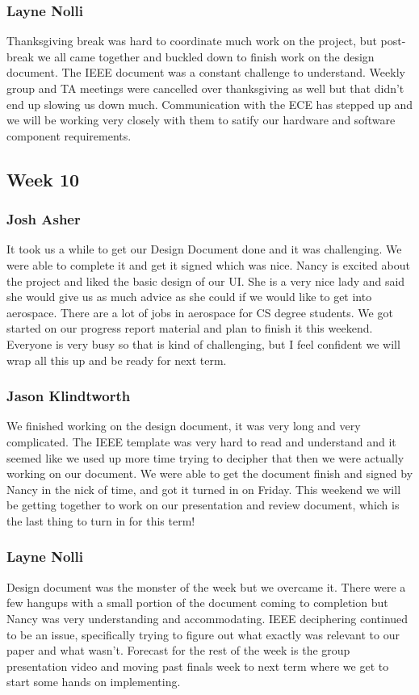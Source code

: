 \documentclass[10pt,draftclsnofoot,onecolumn]{IEEEtran}
\begin{document}
\subsubsection{Layne Nolli}
Thanksgiving break was hard to coordinate much work on the project, but post-break we all came together and buckled down to finish work on the design document. The IEEE document was a constant challenge to understand. Weekly group and TA meetings were cancelled over thanksgiving as well but that didn't end up slowing us down much. Communication with the ECE has stepped up and we will be working very closely with them to satify our hardware and software component requirements.

\subsection{Week 10}

\subsubsection{Josh Asher} It took us a while to get our Design Document done and it was challenging. We were able to complete it and get it signed which was nice. Nancy is excited about the project and liked the basic design of our UI. She is a very nice lady and said she would give us as much advice as she could if we would like to get into aerospace. There are a lot of jobs in aerospace for CS degree students. We got started on our progress report material and plan to finish it this weekend. Everyone is very busy so that is kind of challenging, but I feel confident we will wrap all this up and be ready for next term.

\subsubsection{Jason Klindtworth}
We finished working on the design document, it was very long and very complicated. The IEEE template was very hard to read and understand and it seemed like we used up more time trying to decipher that then we were actually working on our document. We were able to get the document finish and signed by Nancy in the nick of time, and got it turned in on Friday. This weekend we will be getting together to work on our presentation and review document, which is the last thing to turn in for this term!

\subsubsection{Layne Nolli}
Design document was the monster of the week but we overcame it. There were a few hangups with a small portion of the document coming to completion but Nancy was very understanding and accommodating. IEEE deciphering continued to be an issue, specifically trying to figure out what exactly was relevant to our paper and what wasn't. Forecast for the rest of the week is the group presentation video and moving past finals week to next term where we get to start some hands on implementing.
\end{document}
